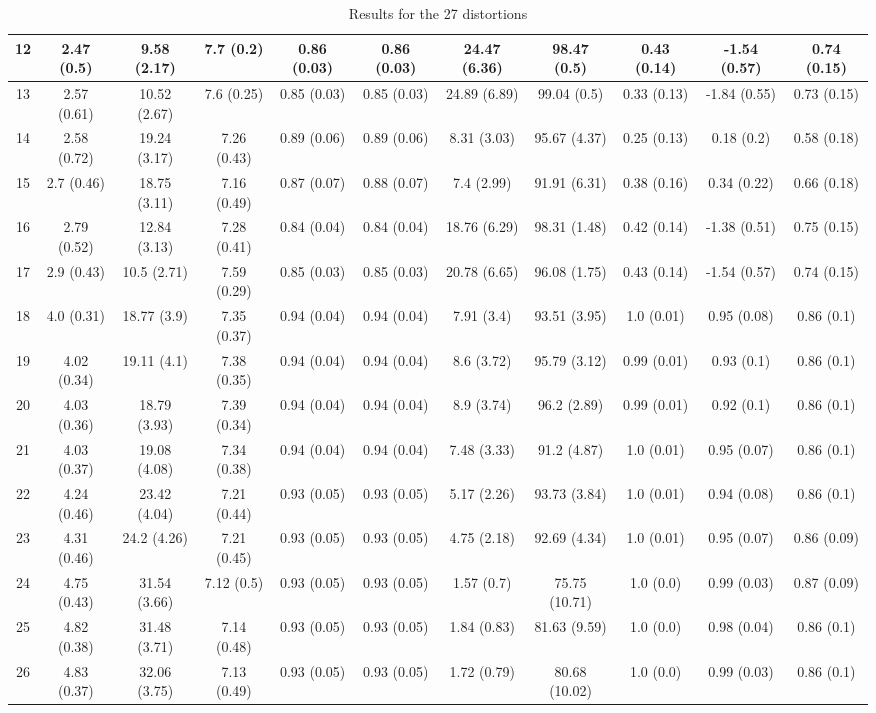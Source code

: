 \documentclass{article}
\begin{document}
\begin{table}[ht]
{\begin{tabular}{|c|c|c|c|c|c|c|c|c|c|c|}
12	& 2.47 (0.5)	& 9.58 (2.17)	& 7.7 (0.2)	& 0.86 (0.03)	& 0.86 (0.03)	& 24.47 (6.36)	& 98.47 (0.5)	& 0.43 (0.14)	& -1.54 (0.57)	& 0.74 (0.15)	\\ \hline 
13	& 2.57 (0.61)	& 10.52 (2.67)	& 7.6 (0.25)	& 0.85 (0.03)	& 0.85 (0.03)	& 24.89 (6.89)	& 99.04 (0.5)	& 0.33 (0.13)	& -1.84 (0.55)	& 0.73 (0.15)	\\ \hline 
14	& 2.58 (0.72)	& 19.24 (3.17)	& 7.26 (0.43)	& 0.89 (0.06)	& 0.89 (0.06)	& 8.31 (3.03)	& 95.67 (4.37)	& 0.25 (0.13)	& 0.18 (0.2)	& 0.58 (0.18)	\\ \hline 
15	& 2.7 (0.46)	& 18.75 (3.11)	& 7.16 (0.49)	& 0.87 (0.07)	& 0.88 (0.07)	& 7.4 (2.99)	& 91.91 (6.31)	& 0.38 (0.16)	& 0.34 (0.22)	& 0.66 (0.18)	\\ \hline 
16	& 2.79 (0.52)	& 12.84 (3.13)	& 7.28 (0.41)	& 0.84 (0.04)	& 0.84 (0.04)	& 18.76 (6.29)	& 98.31 (1.48)	& 0.42 (0.14)	& -1.38 (0.51)	& 0.75 (0.15)	\\ \hline 
17	& 2.9 (0.43)	& 10.5 (2.71)	& 7.59 (0.29)	& 0.85 (0.03)	& 0.85 (0.03)	& 20.78 (6.65)	& 96.08 (1.75)	& 0.43 (0.14)	& -1.54 (0.57)	& 0.74 (0.15)	\\ \hline 
18	& 4.0 (0.31)	& 18.77 (3.9)	& 7.35 (0.37)	& 0.94 (0.04)	& 0.94 (0.04)	& 7.91 (3.4)	& 93.51 (3.95)	& 1.0 (0.01)	& 0.95 (0.08)	& 0.86 (0.1)	\\ \hline 
19	& 4.02 (0.34)	& 19.11 (4.1)	& 7.38 (0.35)	& 0.94 (0.04)	& 0.94 (0.04)	& 8.6 (3.72)	& 95.79 (3.12)	& 0.99 (0.01)	& 0.93 (0.1)	& 0.86 (0.1)	\\ \hline 
20	& 4.03 (0.36)	& 18.79 (3.93)	& 7.39 (0.34)	& 0.94 (0.04)	& 0.94 (0.04)	& 8.9 (3.74)	& 96.2 (2.89)	& 0.99 (0.01)	& 0.92 (0.1)	& 0.86 (0.1)	\\ \hline 
21	& 4.03 (0.37)	& 19.08 (4.08)	& 7.34 (0.38)	& 0.94 (0.04)	& 0.94 (0.04)	& 7.48 (3.33)	& 91.2 (4.87)	& 1.0 (0.01)	& 0.95 (0.07)	& 0.86 (0.1)	\\ \hline 
22	& 4.24 (0.46)	& 23.42 (4.04)	& 7.21 (0.44)	& 0.93 (0.05)	& 0.93 (0.05)	& 5.17 (2.26)	& 93.73 (3.84)	& 1.0 (0.01)	& 0.94 (0.08)	& 0.86 (0.1)	\\ \hline 
23	& 4.31 (0.46)	& 24.2 (4.26)	& 7.21 (0.45)	& 0.93 (0.05)	& 0.93 (0.05)	& 4.75 (2.18)	& 92.69 (4.34)	& 1.0 (0.01)	& 0.95 (0.07)	& 0.86 (0.09)	\\ \hline 
24	& 4.75 (0.43)	& 31.54 (3.66)	& 7.12 (0.5)	& 0.93 (0.05)	& 0.93 (0.05)	& 1.57 (0.7)	& 75.75 (10.71)	& 1.0 (0.0)	& 0.99 (0.03)	& 0.87 (0.09)	\\ \hline 
25	& 4.82 (0.38)	& 31.48 (3.71)	& 7.14 (0.48)	& 0.93 (0.05)	& 0.93 (0.05)	& 1.84 (0.83)	& 81.63 (9.59)	& 1.0 (0.0)	& 0.98 (0.04)	& 0.86 (0.1)	\\ \hline 
26	& 4.83 (0.37)	& 32.06 (3.75)	& 7.13 (0.49)	& 0.93 (0.05)	& 0.93 (0.05)	& 1.72 (0.79)	& 80.68 (10.02)	& 1.0 (0.0)	& 0.99 (0.03)	& 0.86 (0.1)	\\ \hline 
      \end{tabular}
    }
        \caption{Results for the 27 distortions \label{fig:table}}
    \end{table}
\end{document}
